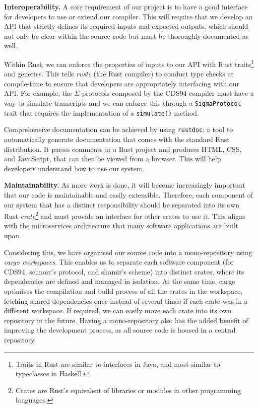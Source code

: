\textbf{Interoperability.} A core requirement of our project is to have a good interface for developers to use or extend our compiler. This will require that we develop an API that strictly defines its required inputs and expected outputs, which should not only be clear within the source code but must be thoroughly documented as well.  

Within Rust, we can enforce the properties of inputs to our API with Rust traits\footnote{Traits in Rust are similar to interfaces in Java, and most similar to typeclasses in Haskell.} and generics. This tells \textit{rustc} (the Rust compiler) to conduct type checks at compile-time to ensure that developers are appropriately interfacing with our API. For example, the $\Sigma$-protocols composed by the CDS94 compiler must have a way to simulate transcripts and we can enforce this through a \texttt{SigmaProtocol} trait that requires the implementation of a \texttt{simulate()} method. 

Comprehensive documentation can be achieved by using \texttt{rustdoc}: a tool to automatically generate documentation that comes with the standard Rust distribution. It parses comments in a Rust project and produces HTML, CSS, and JavaScript, that can then be viewed from a browser. This will help developers understand how to use our system. 


\textbf{Maintainability.} As more work is done, it will become increasingly important that our code is maintainable and easily extensible. Therefore, each component of our system that has a distinct responsibility should be separated into its own Rust \textit{crate}\footnote{Crates are Rust's equivalent of libraries or modules in other programming languages.} and must provide an interface for other crates to use it. This aligns with the microservices architecture that many software applications are built upon. 

Considering this, we have organised our source code into a mono-repository using \textit{cargo workspaces}. This enables us to separate each software component (for CDS94, schnorr's protocol, and shamir's scheme) into distinct crates, where its dependencies are defined and managed in isolation. At the same time, cargo optimises the compilation and build process of all the crates in the workspace, fetching shared dependencies once instead of several times if each crate was in a different workspace. If required, we can easily move each crate into its own repository in the future. Having a mono-repository also has the added benefit of improving the development process, as all source code is housed in a central repository. 

